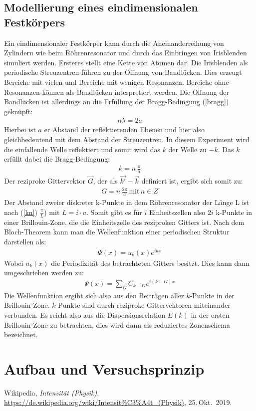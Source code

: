 \documentclass[german,  %
parskip=full,  %
]{scrartcl}
\begin{document}
\subsection{Modellierung eines eindimensionalen Festkörpers}
Ein eindimensionaler Festkörper kann durch die Aneinanderreihung von Zylindern wie beim Röhrenresonator und durch das Einbringen von Irisblenden simuliert werden. Ersteres stellt eine Kette von Atomen dar. Die Irisblenden als periodische Streuzentren führen zu der Öffnung von Bandlücken. Dies erzeugt Bereiche mit vielen und Bereiche mit wenigen Resonanzen. Bereiche ohne Resonanzen können als Bandlücken interpretiert werden. Die Öffnung der Bandlücken ist allerdings an die Erfüllung der Bragg-Bedingung (\ref{bragg}) geknüpft:
\begin{align}
\label{bragg} n\lambda=2a
\end{align}
Hierbei ist $a$ er Abstand der reflektierenden Ebenen und hier also gleichbedeutend mit dem Abstand der Streuzentren. In diesem Experiment wird die einfallende Welle reflektiert und somit wird das $k$ der Welle zu $-k$. Das $k$ erfüllt dabei die Bragg-Bedingung:
\begin{align}
\label{kn}k=n \, \frac{\pi}{a}
\end{align}
Der reziproke Gittervektor $\vec{G}$, der als $\vec{k'} - \vec{k}$ definiert ist, ergibt sich somit zu:
\begin{align}
G=n\,\frac{2\pi}{a} \, \text{mit} \, n \in Z
\end{align}
Der Abstand zweier diskreter k-Punkte in dem Röhrenresonator der Länge L ist nach (\ref{kn}) $\frac{\pi}{L}$) mit $L=i\cdot a$. Somit gibt es für $i$ Einheitszellen also $2i$ k-Punkte in einer Brillouin-Zone, die die Einheitszelle des reziproken Gitters ist. Nach dem Bloch-Theorem kann man die Wellenfunktion einer periodischen Struktur darstellen als: 
\begin{align}
\label{bloch} \Psi(x)=u_{k}(x)e^{ikx}
\end{align}
Wobei $u_k(x)$ die Periodizität des betrachteten Gitters besitzt. Dies kann dann umgeschrieben werden zu:
\begin{align}
\Psi(x)=\sum_{G} C_{k-G} e^{i(k-G)x}
\end{align}
Die Wellenfunktion ergibt sich also aus den Beiträgen aller $k$-Punkte in der Brillouin-Zone. $k$-Punkte sind durch reziproke Gittervektoren miteinander verbunden. Es reicht also aus die Dispersionsrelation $E(k)$ in der ersten Brillouin-Zone zu betrachten, dies wird dann als reduziertes Zonenschema bezeichnet.


\section{Aufbau und Versuchsprinzip}








    \begin{thebibliography}{9}
    Wikipedia,
    \emph{Intensität (Physik)},
    \url{https://de.wikipedia.org/wiki/Intensit%C3%A4t_(Physik)},
    25.\,Okt.~2019.
    \end{thebibliography}
\end{document}
